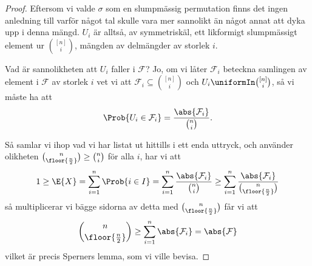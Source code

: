 \documentclass[nobib]{tufte-handout}
\begin{document}
\begin{lemma}
\begin{proof}
        Eftersom vi valde $\sigma$ som en slumpmässig permutation finns det ingen anledning till varför något tal skulle vara mer sannolikt än något annat att dyka upp i denna mängd. $U_i$ är alltså, av symmetriskäl, ett likformigt slumpmässigt element ur $\binom{[n]}{i}$, mängden av delmängder av storlek $i$.

        Vad är sannolikheten att $U_i$ faller i $\mathcal{F}$? Jo, om vi låter $\mathcal{F}_i$ beteckna samlingen av element i $\mathcal{F}$ av storlek $i$ vet vi att $\mathcal{F}_i \subseteq \binom{[n]}{i}$  och $U_i \uniformIn \binom{[n]}{i}$, så vi måste ha att
        $$\Prob{U_i \in \mathcal{F}_i} = \frac{\abs{\mathcal{F}_i}}{\binom{n}{i}}.$$

        Så samlar vi ihop vad vi har listat ut hittills i ett enda uttryck, och använder olikheten $\binom{n}{\floor{\frac{n}{2}}} \geq \binom{n}{i}$ för alla $i$, har vi att
        $$1 \geq \E{X} = \sum_{i=1}^{n} \Prob{i \in I} = \sum_{i=1}^{n} \frac{\abs{\mathcal{F}_i}}{\binom{n}{i}} \geq \sum_{i=1}^{n} \frac{\abs{\mathcal{F}_i}}{\binom{n}{\floor{\frac{n}{2}}}}$$
        så multiplicerar vi bägge sidorna av detta med $\binom{n}{\floor{\frac{n}{2}}}$ får vi att
        $$\binom{n}{\floor{\frac{n}{2}}} \geq \sum_{i=1}^{n} \abs{\mathcal{F}_i} = \abs{\mathcal{F}}$$
        vilket är precis Sperners lemma, som vi ville bevisa.
    \end{proof}
\end{lemma}
\end{document}

